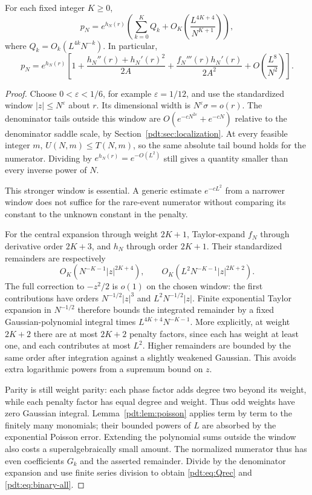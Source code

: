 \begin{theorem}\label{pdt:thm:binary-all}
For each fixed integer $K\ge0$,
\begin{equation}\label{pdt:eq:binary-all}
 p_N=e^{h_N(r)}\left(\sum_{k=0}^K Q_k
                   +O_K\!\left(\frac{L^{4K+4}}{N^{K+1}}\right)\right),
\end{equation}
where $Q_k=O_k(L^{4k}N^{-k})$. In particular,
\begin{equation}\label{pdt:eq:binary-first}
 p_N=e^{h_N(r)}\left[1+\frac{h_N''(r)+h_N'(r)^2}{2A}
              +\frac{f_N'''(r)h_N'(r)}{2A^2}
              +O\!\left(\frac{L^8}{N^2}\right)\right].
\end{equation}
\end{theorem}
\begin{proof}
Choose $0<\varepsilon<1/6$, for example $\varepsilon=1/12$, and use the standardized window $|z|\le N^\varepsilon$ about $r$. Its dimensional width is $N^\varepsilon\sigma=o(r)$. The denominator tails outside this window are $O(e^{-cN^{2\varepsilon}}+e^{-cN})$ relative to the denominator saddle scale, by Section~\ref{pdt:sec:localization}. At every feasible integer $m$, $U(N,m)\le T(N,m)$, so the same absolute tail bound holds for the numerator. Dividing by $e^{h_N(r)}=e^{-O(L^2)}$ still gives a quantity smaller than every inverse power of $N$.

This stronger window is essential. A generic estimate $e^{-cL^2}$ from a narrower window does not suffice for the rare-event numerator without comparing its constant to the unknown constant in the penalty.

For the central expansion through weight $2K+1$, Taylor-expand $f_N$ through derivative order $2K+3$, and $h_N$ through order $2K+1$. Their standardized remainders are respectively
\[
 O_K(N^{-K-1}|z|^{2K+4}),\qquad
 O_K(L^2N^{-K-1}|z|^{2K+2}).
\]
The full correction to $-z^2/2$ is $o(1)$ on the chosen window: the first contributions have orders $N^{-1/2}|z|^3$ and $L^2N^{-1/2}|z|$. Finite exponential Taylor expansion in $N^{-1/2}$ therefore bounds the integrated remainder by a fixed Gaussian-polynomial integral times
$L^{4K+4}N^{-K-1}$. More explicitly, at weight $2K+2$ there are at most $2K+2$ penalty factors, since each has weight at least one, and each contributes at most $L^2$. Higher remainders are bounded by the same order after integration against a slightly weakened Gaussian. This avoids extra logarithmic powers from a supremum bound on $z$.

Parity is still weight parity: each phase factor adds degree two beyond its weight, while each penalty factor has equal degree and weight. Thus odd weights have zero Gaussian integral. Lemma~\ref{pdt:lem:poisson} applies term by term to the finitely many monomials; their bounded powers of $L$ are absorbed by the exponential Poisson error. Extending the polynomial sums outside the window also costs a superalgebraically small amount. The normalized numerator thus has even coefficients $G_k$ and the asserted remainder. Divide by the denominator expansion and use finite series division to obtain \eqref{pdt:eq:Qrec} and \eqref{pdt:eq:binary-all}.


\end{proof}
